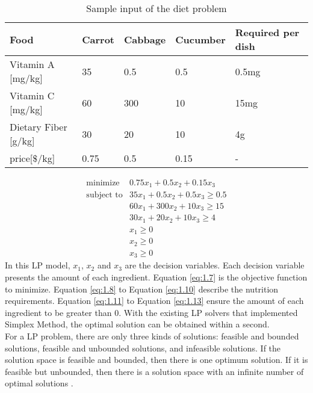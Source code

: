 \begin{table} 
\begin{center}
\begin{tabular}{| l | l  l  l | l |}
\hline
Food & Carrot & Cabbage & Cucumber & Required per dish \\ \hline
Vitamin A [mg/kg] & 35 & 0.5 & 0.5 & 0.5mg \\ 
Vitamin C [mg/kg] & 60 & 300 & 10 & 15mg \\ 
Dietary Fiber [g/kg] & 30 & 20 & 10 & 4g \\ \hline
price[$\$$/kg] & 0.75 & 0.5 & 0.15 & - \\ \hline
\end{tabular} 
\end{center}
\caption{Sample input of the diet problem}
\label{tab:1.1}
\end{table}	

\begin{eqnarray} 
\text{minimize} & 0.75x_{1} + 0.5x_{2} +  0.15x_{3}  \label{eq:1.7} \\
\text{subject to} & 35x_{1} + 0.5x_{2} + 0.5x_{3} \geq 0.5 \label{eq:1.8} \\
& 60x_{1} + 300x_{2} + 10x_{3} \geq 15 \label{eq:1.9} \\
& 30x_{1} + 20x_{2} + 10x_{3} \geq 4 \label{eq:1.10} \\
& x_{1} \geq 0  \label{eq:1.11} \\
& x_{2} \geq 0  \label{eq:1.12} \\
& x_{3} \geq 0  \label{eq:1.13}
\end{eqnarray} 
In this LP model, $x_{1}$, $x_{2}$ and $x_{3}$ are the decision variables. Each decision variable presents the amount of each ingredient. Equation \ref{eq:1.7} is the objective function to minimize. Equation \ref{eq:1.8} to Equation \ref{eq:1.10} describe the nutrition requirements. Equation \ref{eq:1.11} to Equation \ref{eq:1.13} ensure the amount of each ingredient to be greater than 0. With the existing LP solvers that implemented Simplex Method, the optimal solution can be obtained within a second. \\

For a LP problem, there are only three kinds of solutions: feasible and bounded solutions, feasible and unbounded solutions, and infeasible solutions. If the solution space is feasible and bounded, then there is one optimum solution. If it is feasible but unbounded, then there is a solution space with an infinite number of optimal solutions \cite{LP}. \\

